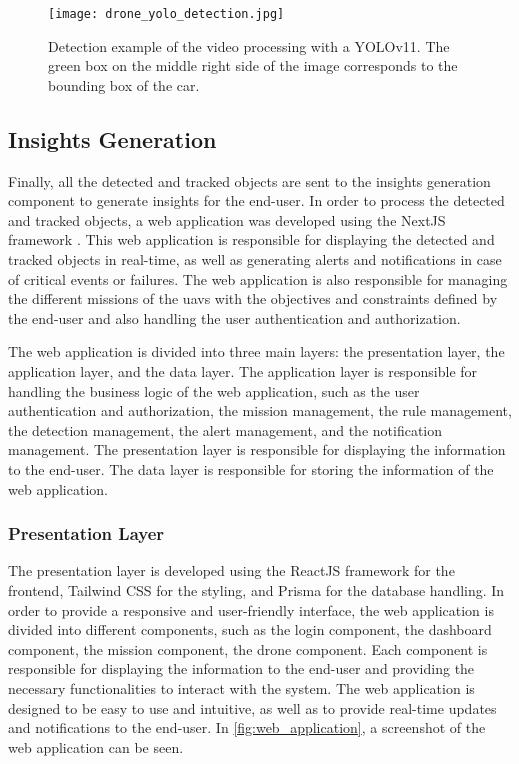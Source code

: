 \begin{figure}
	\texttt{[image: drone\_yolo\_detection.jpg]}
	\caption{Detection example of the video processing with a YOLOv11. The green box  on the middle right side of the image corresponds to the bounding box of the car.}\label{fig:drone_yolo_detection}
\end{figure}

\subsection{Insights Generation}\label{subsec:implementation_insights_generation}

Finally, all the detected and tracked objects are sent to the insights generation component to generate insights for the end-user. In order to process the detected and tracked objects, a web application was developed using the NextJS framework \autocite{nextjsNextjsVercel}. This web application is responsible for displaying the detected and tracked objects in real-time, as well as generating alerts and notifications in case of critical events or failures. The web application is also responsible for managing the different missions of the \glspl{uav} with the objectives and constraints defined by the end-user and also handling the user authentication and authorization.

The web application is divided into three main layers: the presentation layer, the application layer, and the data layer. The application layer is responsible for handling the business logic of the web application, such as the user authentication and authorization, the mission management, the rule management, the detection management, the alert management, and the notification management. The presentation layer is responsible for displaying the information to the end-user. The data layer is responsible for storing the information of the web application.

\subsubsection{Presentation Layer}\label{subsubsec:implementation_presentation_layer}

The presentation layer is developed using the ReactJS framework \autocite{reactReact} for the frontend, Tailwind CSS \autocite{tailwindcssTailwindRapidly} for the styling, and Prisma \autocite{prismaPrismaSimplify} for the database handling. In order to provide a responsive and user-friendly interface, the web application is divided into different components, such as the login component, the dashboard component, the mission component, the drone component. Each component is responsible for displaying the information to the end-user and providing the necessary functionalities to interact with the system. The web application is designed to be easy to use and intuitive, as well as to provide real-time updates and notifications to the end-user. In \cref{fig:web_application}, a screenshot of the web application can be seen.

